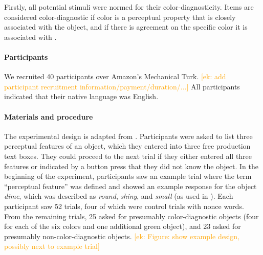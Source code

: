 \documentclass[a4paper,man,floatsintext,natbib,donotrepeattitle]{apa6}
\newcommand{\ek}[1]{\textcolor{Orange}{[ek: #1]}}
\begin{document}





Firstly, all potential stimuli were normed for their color-diagnosticity. Items are considered color-diagnostic if color is a perceptual property that is closely associated with the object, and if there is agreement on the specific color it is associated with \cite{Tanaka:1999}.

\paragraph{Participants}
We recruited 40 participants over Amazon's Mechanical Turk. \ek{add participant recruitment information/payment/duration/...} All participants indicated that their native language was English.

\paragraph{Materials and procedure}
The experimental design is adapted from \cite{Tanaka:1999}. 
Participants were asked to list three perceptual features of an object, which they entered into three free production text boxes. They could proceed to the next trial if they either entered all three features or indicated by a button press that they did not know the object. In the beginning of the experiment, participants saw an example trial where the term ``perceptual feature'' was defined and showed an example response for the object \textit{dime}, which was described as \textit{round}, \textit{shiny}, and \textit{small} (as used in \cite{Tanaka:1999}).
Each participant saw 52 trials, four of which were control trials with nonce words. From the remaining trials, 25 asked for presumably color-diagnostic objects (four for each of the six colors and one additional green object), and 23 asked for presumably non-color-diagnostic objects. \ek{Figure: show example design, possibly next to example trial}
\end{document}
